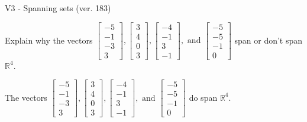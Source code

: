 \begin{exercise}
  \begin{exerciseTitle}V3 - Spanning sets (ver. 183)\end{exerciseTitle}
  \begin{exerciseStatement}
    Explain why the vectors \(\left[\begin{array}{r}
-5 \\
-1 \\
-3 \\
3
\end{array}\right] , \left[\begin{array}{r}
3 \\
4 \\
0 \\
3
\end{array}\right] , \left[\begin{array}{r}
-4 \\
-1 \\
3 \\
-1
\end{array}\right] , \text{ and } \left[\begin{array}{r}
-5 \\
-5 \\
-1 \\
0
\end{array}\right]\) span or don't span \(\mathbb{R}^4\). 
	


  \end{exerciseStatement}
  \begin{exerciseAnswer}
   The vectors \(\left[\begin{array}{r}
-5 \\
-1 \\
-3 \\
3
\end{array}\right] , \left[\begin{array}{r}
3 \\
4 \\
0 \\
3
\end{array}\right] , \left[\begin{array}{r}
-4 \\
-1 \\
3 \\
-1
\end{array}\right] , \text{ and } \left[\begin{array}{r}
-5 \\
-5 \\
-1 \\
0
\end{array}\right]\) 
  	 do  
	span \(\mathbb{R}^4\).
  


  \end{exerciseAnswer}
\end{exercise}